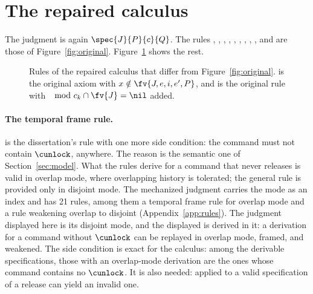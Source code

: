 \section{The repaired calculus}
\label{sec:calculus}

The judgment is again $\spec{J}{P}{c}{Q}$. The rules ,
, , , , , ,
, ,  and  are those of
Figure~\ref{fig:original}. Figure~\ref{fig:repaired} shows the rest.

\begin{figure}[!ht]
\small
{}
\caption{Rules of the repaired calculus that differ from
Figure~\ref{fig:original}.  is the original axiom with
$x \notin \fv{J,e,i,e',P}$, and  is the original rule with
$\mod{c_k} \cap \fv{J} = \nil$ added.}
\label{fig:repaired}
\end{figure}

\paragraph{The temporal frame rule.}
 is the dissertation's rule with one more side condition: the
command must not contain $\cunlock$, anywhere. The reason is the semantic
one of Section~\ref{sec:model}. What the rules derive for a command that never releases is
valid in overlap mode, where overlapping history is tolerated; the
general  rule is provided only in disjoint mode. The mechanized judgment carries the mode as an
index and has 21 rules, among them a temporal frame rule for overlap mode
and a rule weakening overlap to disjoint (Appendix~\ref{app:rules}). The
judgment displayed here is its disjoint mode, and the displayed
 is derived in it: a derivation for a command without
$\cunlock$ can be replayed in overlap mode, framed, and weakened. The side condition is exact for the calculus: among the derivable
specifications, those with an overlap-mode derivation are the ones whose
command contains no $\cunlock$. It is also
needed:  applied to a valid specification of a release can
yield an invalid one.

